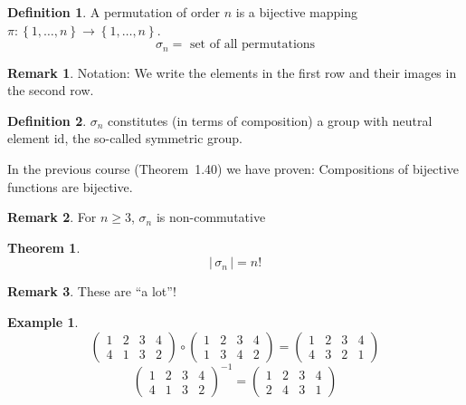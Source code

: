 \documentclass[a4paper,landscape,twocolumn]{article}
\newcommand\set[1]{\left\{#1\right\}}
\newcommand\card[1]{\left|\,#1\,\right|}
\theoremstyle{definition}
\newtheorem{theorem}{Theorem}
\newtheorem{defi}{Definition}
\newtheorem{ex}{Example}
\newtheorem{rem}{Remark}
\begin{document}
\begin{defi}
  \label{defi-7.8}
  A permutation of order $n$ is a bijective mapping $\pi: \set{1, \ldots, n} \to \set{1, \ldots, n}$.
  \[ \sigma_n = \text{ set of all permutations} \]
\end{defi}
\begin{rem}
  Notation:
  We write the elements in the first row and their images in the second row.
\end{rem}
\begin{defi}
  \label{defi-7.9}
  $\sigma_n$ constitutes (in terms of composition) a group with neutral element $\text{id}$,
  the so-called symmetric group.
\end{defi}

In the previous course (Theorem~1.40) we have proven: Compositions of bijective functions are bijective.
\begin{rem}
  For $n \geq 3$, $\sigma_n$ is non-commutative
\end{rem}
\begin{theorem}
  \label{satz-7.10}
  \[ \card{\sigma_n} = n! \]
\end{theorem}
\begin{rem}
  These are \enquote{a lot}!
\end{rem}
\begin{ex}
  \label{example-7.11}
  \[
    \begin{pmatrix}
      1 & 2 & 3 & 4 \\
      4 & 1 & 3 & 2
    \end{pmatrix} \circ \begin{pmatrix}
      1 & 2 & 3 & 4 \\
      1 & 3 & 4 & 2
    \end{pmatrix}
    = \begin{pmatrix}
      1 & 2 & 3 & 4 \\
      4 & 3 & 2 & 1
    \end{pmatrix}
  \] \[
    \begin{pmatrix}
      1 & 2 & 3 & 4 \\
      4 & 1 & 3 & 2
    \end{pmatrix}^{-1}
    = \begin{pmatrix}
      1 & 2 & 3 & 4 \\
      2 & 4 & 3 & 1
    \end{pmatrix}
  \]
\end{ex}
\end{document}
